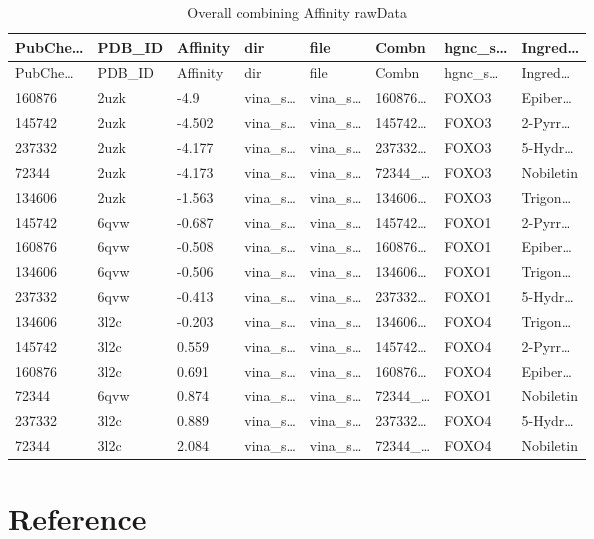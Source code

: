 \documentclass[
]{article}
\begin{document}
\begin{longtable}[]{@{}llllllll@{}}
\caption{\label{tab:Overall-combining-Affinity-rawData}Overall combining Affinity rawData}\tabularnewline
\toprule
PubChe\ldots{} & PDB\_ID & Affinity & dir & file & Combn & hgnc\_s\ldots{} & Ingred\ldots{}\tabularnewline
\midrule
\endfirsthead
\toprule
PubChe\ldots{} & PDB\_ID & Affinity & dir & file & Combn & hgnc\_s\ldots{} & Ingred\ldots{}\tabularnewline
\midrule
\endhead
160876 & 2uzk & -4.9 & vina\_s\ldots{} & vina\_s\ldots{} & 160876\ldots{} & FOXO3 & Epiber\ldots{}\tabularnewline
145742 & 2uzk & -4.502 & vina\_s\ldots{} & vina\_s\ldots{} & 145742\ldots{} & FOXO3 & 2-Pyrr\ldots{}\tabularnewline
237332 & 2uzk & -4.177 & vina\_s\ldots{} & vina\_s\ldots{} & 237332\ldots{} & FOXO3 & 5-Hydr\ldots{}\tabularnewline
72344 & 2uzk & -4.173 & vina\_s\ldots{} & vina\_s\ldots{} & 72344\_\ldots{} & FOXO3 & Nobiletin\tabularnewline
134606 & 2uzk & -1.563 & vina\_s\ldots{} & vina\_s\ldots{} & 134606\ldots{} & FOXO3 & Trigon\ldots{}\tabularnewline
145742 & 6qvw & -0.687 & vina\_s\ldots{} & vina\_s\ldots{} & 145742\ldots{} & FOXO1 & 2-Pyrr\ldots{}\tabularnewline
160876 & 6qvw & -0.508 & vina\_s\ldots{} & vina\_s\ldots{} & 160876\ldots{} & FOXO1 & Epiber\ldots{}\tabularnewline
134606 & 6qvw & -0.506 & vina\_s\ldots{} & vina\_s\ldots{} & 134606\ldots{} & FOXO1 & Trigon\ldots{}\tabularnewline
237332 & 6qvw & -0.413 & vina\_s\ldots{} & vina\_s\ldots{} & 237332\ldots{} & FOXO1 & 5-Hydr\ldots{}\tabularnewline
134606 & 3l2c & -0.203 & vina\_s\ldots{} & vina\_s\ldots{} & 134606\ldots{} & FOXO4 & Trigon\ldots{}\tabularnewline
145742 & 3l2c & 0.559 & vina\_s\ldots{} & vina\_s\ldots{} & 145742\ldots{} & FOXO4 & 2-Pyrr\ldots{}\tabularnewline
160876 & 3l2c & 0.691 & vina\_s\ldots{} & vina\_s\ldots{} & 160876\ldots{} & FOXO4 & Epiber\ldots{}\tabularnewline
72344 & 6qvw & 0.874 & vina\_s\ldots{} & vina\_s\ldots{} & 72344\_\ldots{} & FOXO1 & Nobiletin\tabularnewline
237332 & 3l2c & 0.889 & vina\_s\ldots{} & vina\_s\ldots{} & 237332\ldots{} & FOXO4 & 5-Hydr\ldots{}\tabularnewline
72344 & 3l2c & 2.084 & vina\_s\ldots{} & vina\_s\ldots{} & 72344\_\ldots{} & FOXO4 & Nobiletin\tabularnewline
\bottomrule
\end{longtable}

\hypertarget{bibliography}{%
\section*{Reference}\label{bibliography}}
\end{document}
